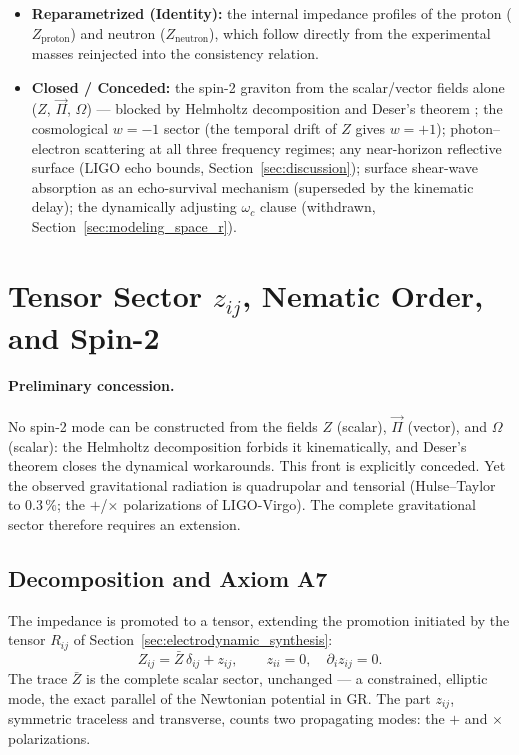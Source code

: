 \documentclass[11pt,a4paper]{article}
\theoremstyle{plain}
\theoremstyle{remark}
\begin{document}
\begin{itemize}
    \item \textbf{Reparametrized (Identity):} the internal impedance profiles of the proton ($Z_{\text{proton}}$) and neutron ($Z_{\text{neutron}}$), which follow directly from the experimental masses reinjected into the consistency relation.
    \item \textbf{Closed / Conceded:} the spin-2 graviton from the scalar/vector fields alone ($Z$, $\vec{\Pi}$, $\Omega$) --- blocked by Helmholtz decomposition and Deser's theorem \cite{deser1970}; the cosmological $w = -1$ sector (the temporal drift of $Z$ gives $w = +1$); photon--electron scattering at all three frequency regimes; any near-horizon reflective surface (LIGO echo bounds, Section~\ref{sec:discussion}); surface shear-wave absorption as an echo-survival mechanism (superseded by the kinematic delay); the dynamically adjusting $\omega_c$ clause (withdrawn, Section~\ref{sec:modeling_space_r}).
\end{itemize}

\section{Tensor Sector $z_{ij}$, Nematic Order, and Spin-2}
\label{sec:tensor_sector}

\paragraph{Preliminary concession.} No spin-2 mode can be constructed from the fields $Z$ (scalar), $\vec{\Pi}$ (vector), and $\Omega$ (scalar): the Helmholtz decomposition forbids it kinematically, and Deser's theorem \cite{deser1970} closes the dynamical workarounds. This front is explicitly conceded. Yet the observed gravitational radiation is quadrupolar and tensorial (Hulse--Taylor to $0.3\,\%$; the $+$/$\times$ polarizations of LIGO-Virgo). The complete gravitational sector therefore requires an extension.

\subsection{Decomposition and Axiom A7}
The impedance is promoted to a tensor, extending the promotion initiated by the tensor $R_{ij}$ of Section~\ref{sec:electrodynamic_synthesis}:
\begin{equation}
Z_{ij} = \bar{Z}\,\delta_{ij} + z_{ij}, \qquad z_{ii} = 0, \quad \partial_i z_{ij} = 0.
\end{equation}
The trace $\bar{Z}$ is the complete scalar sector, unchanged --- a constrained, elliptic mode, the exact parallel of the Newtonian potential in GR. The part $z_{ij}$, symmetric traceless and transverse, counts two propagating modes: the $+$ and $\times$ polarizations.
\end{document}
